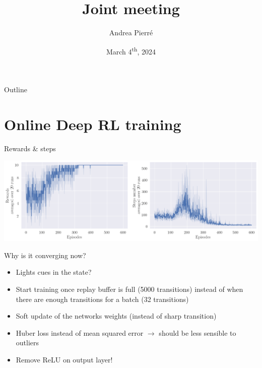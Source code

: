 \documentclass[bigger]{beamer}
\author{Andrea Pierré}
\date{March 4\textsuperscript{th}, 2024}
\title{Joint meeting}
\institute{Brown University}
\begin{document}
\maketitle
\begin{frame}[plain]{Outline}
\tableofcontents
\end{frame}

\section{Online Deep RL training}
\label{sec:org99fed52}
\begin{frame}[label={sec:org692078c}]{Rewards \& steps}
\begin{center}
\includegraphics[width=\linewidth]{img/steps-and-rewards.png}
\end{center}
\end{frame}
\begin{frame}[<+->][label={sec:org86bc518}]{Why is it converging now?}
\begin{itemize}
\item Lights cues in the state?
\item Start training once replay buffer is full (5000 transitions) instead of when there are enough transitions for a batch (32 transitions)
\item Soft update of the networks weights (instead of sharp transition)
\item Huber loss instead of mean squared error \(\to\) should be less sensible to outliers
\item \alert{Remove ReLU on output layer!}
\end{itemize}
\end{frame}
\end{document}
